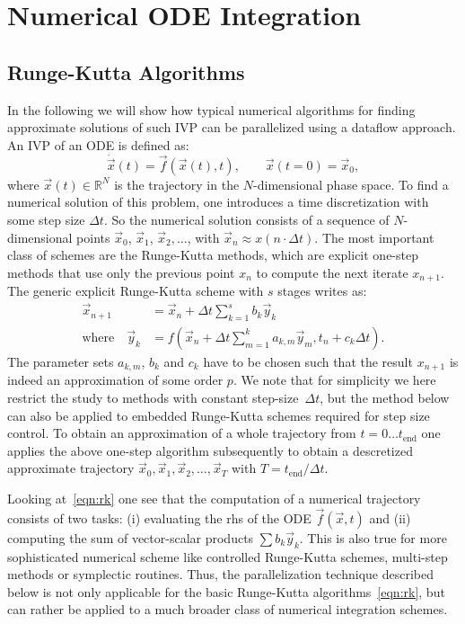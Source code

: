 \documentclass[10pt]{elsarticle}
\newcommand{\Dt}{\Delta t}
\begin{document}
\section{Numerical ODE Integration} \label{sec:num_ode_int}

\subsection{Runge-Kutta Algorithms}

In the following we will show how typical numerical algorithms for finding approximate solutions of such IVP can be parallelized using a dataflow approach.
An IVP of an ODE is defined as:
\begin{equation}
 \dot{\vec x}(t) = \vec f(\vec x(t), t), \qquad \vec x(t=0) = \vec x_0,
\end{equation}
where $\vec x(t) \in \mathbb{R}^N$ is the trajectory in the $N$-dimensional phase space.
To find a numerical solution of this problem, one introduces a time discretization with some step size $\Dt$.
So the numerical solution consists of a sequence of $N$-dimensional points $\vec x_0$, $\vec x_1$, $\vec x_2,\dots$, with $\vec x_n \approx x(n\cdot \Dt)$.
The most important class of schemes are the Runge-Kutta methods, which are explicit one-step methods that use only the previous point $x_n$ to compute the next iterate $x_{n+1}$.
The generic explicit Runge-Kutta scheme with $s$ stages writes as:
\begin{equation} \label{eqn:rk}
 \begin{aligned}
    \vec x_{n+1} &= \vec x_n + \Dt \sum_{k=1}^{s} b_k \vec y_k \\
    \text{where}\quad \vec y_k &= f( \vec x_n + \Dt \sum_{m=1}^k a_{k,m} \vec y_m , t_n+c_k\Dt).
   \end{aligned}
\end{equation}
The parameter sets $a_{k,m}$, $b_k$ and $c_k$ have to be chosen such that the result $x_{n+1}$ is indeed an approximation of some order $p$.
We note that for simplicity we here restrict the study to methods with constant step-size~$\Dt$, but the method below can also be applied to embedded Runge-Kutta schemes required for step size control.
To obtain an approximation of a whole trajectory from $t=0\dots t_\text{end}$ one applies the above one-step algorithm subsequently to obtain a descretized approximate trajectory $\vec x_0,\vec x_1,\vec x_2,\dots,\vec x_T$ with $T=t_\text{end}/\Dt$.

Looking at~\eqref{eqn:rk} one see that the computation of a numerical trajectory consists of two tasks: (i) evaluating the rhs of the ODE $\vec f(\vec x,t)$ and (ii) computing the sum of vector-scalar products $\sum b_k \vec y_k$.
This is also true for more sophisticated numerical scheme like controlled Runge-Kutta schemes, multi-step methods or symplectic routines.
Thus, the parallelization technique described below is not only applicable for the basic Runge-Kutta algorithms~\eqref{eqn:rk}, but can rather be applied to a much broader class of numerical integration schemes.
\end{document}
